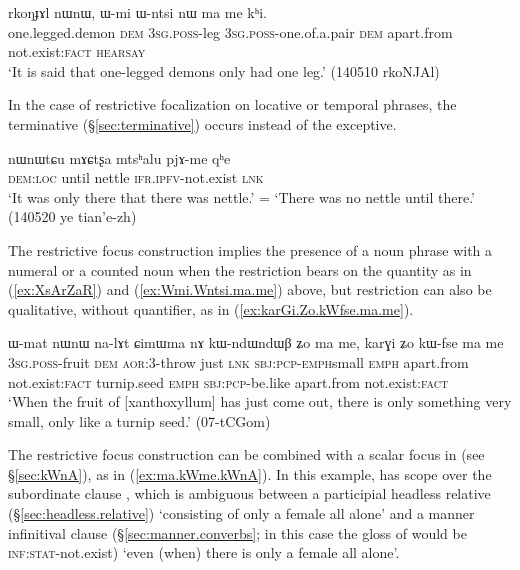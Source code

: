   \begin{exe}
\ex  \label{ex:Wmi.Wntsi.ma.me}
\gll  rkoŋɟɤl nɯnɯ, ɯ-mi ɯ-ntsi nɯ ma me kʰi.   \\
one.legged.demon \textsc{dem} \textsc{3sg}.\textsc{poss}-leg \textsc{3sg}.\textsc{poss}-one.of.a.pair \textsc{dem} apart.from not.exist:\textsc{fact} \textsc{hearsay} \\
\glt  `It is said that one-legged demons only had one leg.' (140510 rkoNJAl)
  \end{exe}
  
In the case of restrictive focalization on locative or temporal phrases,   the terminative  (§\ref{sec:terminative}) occurs instead of the exceptive.
  
\begin{exe}
\ex  \label{ex:nWnWtCu.mACtsxa.pjAme}
\gll  nɯnɯtɕu mɤɕtʂa mtsʰalu pjɤ-me qʰe \\
\textsc{dem}:\textsc{loc} until nettle  \textsc{ifr}.\textsc{ipfv}-not.exist \textsc{lnk} \\
\glt `It was only there that there was nettle.' =  `There was no nettle until there.' (140520 ye tian'e-zh)
\end{exe}
    
The restrictive focus construction implies the presence of a noun phrase with a numeral or a counted noun when the restriction bears on the quantity as in (\ref{ex:XsArZaR}) and (\ref{ex:Wmi.Wntsi.ma.me}) above, but restriction can also be qualitative, without quantifier, as in (\ref{ex:karGi.Zo.kWfse.ma.me}).

\begin{exe}
\ex \label{ex:karGi.Zo.kWfse.ma.me}
 \gll   ɯ-mat nɯnɯ na-lɤt ɕimɯma nɤ kɯ-ndɯ\redp{}ndɯβ ʑo ma me, karɣi ʑo kɯ-fse ma me  \\
 \textsc{3sg}.\textsc{poss}-fruit \textsc{dem} \textsc{aor}:3\flobv{}-throw just \textsc{lnk}  \textsc{sbj}:\textsc{pcp}-\textsc{emph}\redp{}small \textsc{emph} apart.from not.exist:\textsc{fact} turnip.seed \textsc{emph} \textsc{sbj}:\textsc{pcp}-be.like apart.from not.exist:\textsc{fact} \\
 \glt  `When the fruit of [xanthoxyllum] has just come out, there is only something very small, only like a turnip seed.'  (07-tCGom) 	
\end{exe}
  
The restrictive focus construction can be combined with a scalar focus in  (see §\ref{sec:kWnA}), as in (\ref{ex:ma.kWme.kWnA}). In this example,  has scope over the subordinate clause , which is ambiguous between a participial headless relative (§\ref{sec:headless.relative}) `consisting of only a female all alone' and a manner infinitival clause (§\ref{sec:manner.converbs}; in this case the gloss of  would be \textsc{inf}:\textsc{stat}-not.exist) `even (when) there is only a female all alone'.

